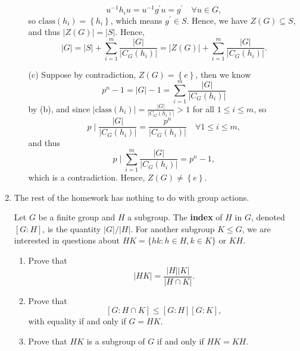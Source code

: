\documentclass[a4paper,12pt]{article}
\begin{document}
\begin{enumerate}
\begin{itemize}
        \[
            u^{-1} h_i u = u^{-1} g^{\prime} u = g^{\prime} \quad \forall u \in G,
        \] so \(\mathrm{class}(h_i) = \left\{ h_i \right\}  \), which means \(g^{\prime} \in S\). Hence, we have \(Z(G) \subseteq S\), and thus \(\left\vert Z(G) \right\vert = \vert S \vert  \). Hence,
        \[
            \vert G \vert = \vert S \vert + \sum_{i=1}^{m} \frac{\vert G \vert }{\vert C_G(h_i) \vert } = \vert Z(G) \vert + \sum_{i=1}^{m} \frac{\vert G \vert }{\vert C_G(h_i) \vert }.   
        \]     
        \item [(c)] Suppose by contradiction, \(Z(G) = \left\{ e \right\} \), then we know 
        \[
            p^n - 1 = \vert G \vert - 1 = \sum_{i=1}^{m} \frac{\vert G \vert }{\vert C_G(h_i) \vert }  
        \] by (b), and since \(\vert \mathrm{class}(h_i) \vert  =  \frac{\vert G \vert }{\vert C_G(h_i) \vert } > 1\) for all \(1 \le i \le m\), so
        \[
            p \mid \frac{\vert G \vert }{\vert C_G(h_i) \vert } = \frac{p^n}{\vert C_G(h_i) \vert } \quad \forall 1 \le i \le m,
        \] and thus
        \[
            p \mid \sum_{i=1}^m \frac{\vert G \vert }{\vert C_G(h_i) \vert } = p^n - 1, 
        \] which is a contradiction. Hence, \(Z(G) \neq \left\{ e \right\} \). 
    \end{itemize}

    \bigskip

    \item The rest of the homework has nothing to do with group actions.

    Let $G$ be a finite group and $H$ a subgroup. The \textbf{index} of $H$ in $G$, denoted $[G : H]$, is the quantity $|G| / |H|$.  
    For another subgroup $K \le G$, we are interested in questions about $HK = \{ hk : h \in H, k \in K \}$ or $KH$.

    \begin{enumerate}[label=(\alph*)]
        \item Prove that
        \[
            |HK| = \frac{|H||K|}{|H \cap K|}.
        \]

        \item Prove that
        \[
            [G : H \cap K] \le [G : H][G : K],
        \]
        with equality if and only if $G = HK$.

        \item Prove that $HK$ is a subgroup of $G$ if and only if $HK = KH$.


\end{enumerate}
\end{enumerate}
\end{document}
